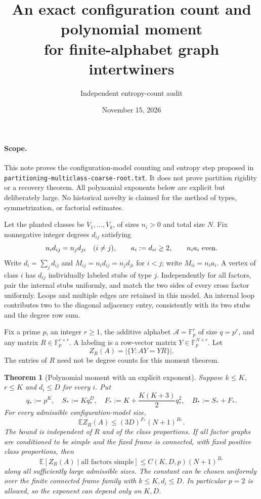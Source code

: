 \documentclass[11pt]{article}
\title{An exact configuration count and polynomial moment\\for finite-alphabet graph intertwiners}
\author{Independent entropy-count audit}
\date{November 15, 2026}
\newtheorem{theorem}{Theorem}
\newcommand{\E}{\mathbb E}
\newcommand{\F}{\mathbb F}
\newcommand{\OO}{\mathcal A}
\begin{document}
\maketitle

\paragraph{Scope.}
This note proves the configuration-model counting and entropy step proposed
in \texttt{partitioning-multiclass-coarse-root.txt}. It does not prove
partition rigidity or a recovery theorem. All polynomial exponents below
are explicit but deliberately large. No historical novelty is claimed for
the method of types, symmetrization, or factorial estimates.

Let the planted classes be $V_1,\ldots,V_k$, of sizes $n_i>0$ and total
size $N$. Fix nonnegative integer degrees $d_{ij}$ satisfying
\[
 n_i d_{ij}=n_jd_{ji}\quad(i\ne j),\qquad
 a_i:=d_{ii}\geq2,\qquad n_i a_i\ \hbox{even}.
\]
Write $d_i=\sum_jd_{ij}$ and $M_{ij}=n_i d_{ij}=n_jd_{ji}$ for $i<j$;
write $M_{ii}=n_i a_i$. A vertex of class $i$ has $d_{ij}$ individually
labeled stubs of type $j$. Independently for all factors, pair the internal
stubs uniformly, and match the two sides of every cross factor uniformly.
Loops and multiple edges are retained in this model. An internal loop
contributes two to the diagonal adjacency entry, consistently with its two
stubs and the degree row sum.

Fix a prime $p$, an integer $r\geq1$, the additive alphabet
$\OO=\F_p^r$ of size $q=p^r$, and any matrix $R\in\F_p^{r\times r}$.
A labeling is a row-vector matrix $Y\in\F_p^{N\times r}$. Let
\[
 Z_R(A)=|\{Y:AY=YR\}|.
\]
The entries of $R$ need not be degree counts for this moment theorem.

\begin{theorem}[Polynomial moment with an explicit exponent]
Suppose $k\leq K$, $r\leq K$ and $d_i\leq D$ for every $i$. Put
\[
 q_*:=p^K,\quad S_*:=Kq_*^D,\quad
 F_*:=K+\frac{K(K+3)}2q_*^2,\quad B_*:=S_*+F_*.
 \tag{1}
\]
For every admissible configuration-model size,
\[
 \E Z_R(A)\leq(3D)^{F_*}(N+1)^{B_*}.                 \tag{2}
\]
The bound is independent of $R$ and of the class proportions. If all
factor graphs are conditioned to be simple and the fixed frame is
connected, with fixed positive class proportions, then
\[
 \E[Z_R(A)\mid\text{all factors simple}]
 \leq C(K,D,p)(N+1)^{B_*}                            \tag{3}
\]
along all sufficiently large admissible sizes. The constant can be chosen
uniformly over the finite connected frame family with $k\leq K,d_i\leq D$.
In particular $p=2$ is allowed, so the exponent can depend only on $K,D$.
\end{theorem}
\end{document}
